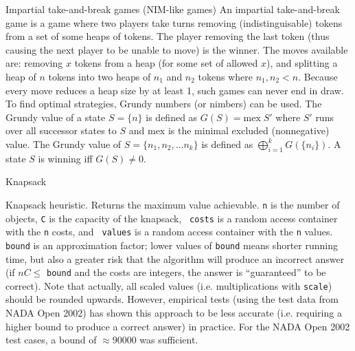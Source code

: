 \categorycontents{}



\begin{algorithm}{Impartial take-and-break games (NIM-like games)}
\desc
An impartial take-and-break game is a game where two players take
turns removing (indistinguisable) tokens from a set of some heaps of
tokens.  The player removing the last token (thus causing the next
player to be unable to move) is the winner.  The moves available are:
removing $x$ tokens from a heap (for some set of allowed $x$), and
splitting a heap of $n$ tokens into two heaps of $n_1$ and $n_2$
tokens where $n_1, n_2 < n$.  Because every move reduces a heap size
by at least 1, such games can never end in draw.  To find optimal
strategies, Grundy numbers (or nimbers) can be used.  The Grundy value
of a state $S = \{n\}$ is defined as $G(S) =
\mathrm{mex}\;S'$ where $S'$ runs over all successor states to $S$ and
$\mathrm{mex}$ is the minimal excluded (nonnegative) value.  The
Grundy value of $S =
\{n_1, n_2, \ldots n_k\}$ is defined as $\bigoplus_{i=1}^{k}
G(\{n_i\})$.  A state $S$ is winning iff $G(S) \ne 0$.

\end{algorithm}


\begin{algorithm}{Knapsack}

\desc
Knapsack heuristic. Returns the maximum value achievable. {\tt n} is
the number of objects, {\tt C} is the capacity of the knapsack, {\tt
costs} is a random access container with the {\tt n} costs, and {\tt
values} is a random access container with the {\tt n} values. {\tt
bound} is an approximation factor; lower values of {\tt bound} means
shorter running time, but also a greater risk that the algorithm will
produce an incorrect answer (if $nC \le $ {\tt bound} and the costs
are integers, the answer is ``guaranteed'' to be correct). Note that
actually, all scaled values (i.e. multiplications with {\tt scale})
should be rounded upwards. However, empirical tests (using the test
data from NADA Open 2002) has shown this approach to be less accurate
(i.e. requiring a higher bound to produce a correct answer) in
practice. For the NADA Open 2002 test cases, a bound of $\approx
90000$ was sufficient.

\end{algorithm}


